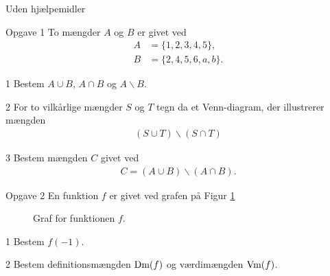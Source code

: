 \begin{center}
	\LARGE
	Uden hjælpemidler
\end{center}
\begin{opgavetekst}{Opgave 1}
	To mængder $A$ og $B$ er givet ved
	\begin{align*}
		A &= \{1,2,3,4,5\}, \\
		B &= \{2,4,5,6,a,b\}.
	\end{align*}
\end{opgavetekst}
\begin{delopgave}{1}
	Bestem $A \cup B$, $A \cap B$ og $A \backslash B$. 
\end{delopgave}
\begin{delopgave}{2}
	For to vilkårlige mængder $S$ og $T$ tegn da et Venn-diagram, der illustrerer mængden 
	\begin{align*}
		(S\cup T)\backslash (S\cap T)
	\end{align*}
\end{delopgave}
\begin{delopgave}{3}
	Bestem mængden $C$ givet ved
	\begin{align*}
		C = (A\cup B)\backslash (A \cap B).
	\end{align*}
\end{delopgave}
\begin{opgavetekst}{Opgave 2}
	En funktion $f$ er givet ved grafen på Figur \ref{fig:defværd}
	\begin{figure}[H]	
	\centering
	\caption{Graf for funktionen $f$.}
	\label{fig:defværd}
	\end{figure}
	\phantom{h}
\end{opgavetekst}
\begin{delopgave}{1}
	Bestem $f(-1)$.
\end{delopgave}
\begin{delopgave}{2}
	Bestem definitionsmængden $\textnormal{Dm}(f)$ og værdimængden $\textnormal{Vm}(f)$.
\end{delopgave}


